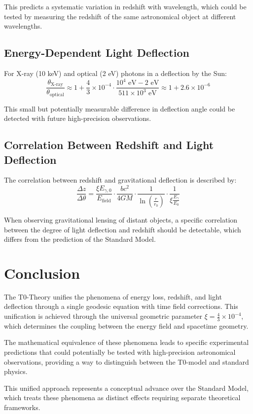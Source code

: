 \documentclass[12pt,a4paper]{article}
\newcommand{\efield}{E_{\text{field}}}
\theoremstyle{definition}
\begin{document}
	This predicts a systematic variation in redshift with wavelength, which could be tested by measuring the redshift of the same astronomical object at different wavelengths.
	
	\subsection{Energy-Dependent Light Deflection}
	
	For X-ray (10 keV) and optical (2 eV) photons in a deflection by the Sun:
	\begin{equation}
		\frac{\theta_{\text{X-ray}}}{\theta_{\text{optical}}} \approx 1 + \frac{4}{3} \times 10^{-4} \cdot \frac{10^4 \text{ eV} - 2 \text{ eV}}{511 \times 10^3 \text{ eV}} \approx 1 + 2.6 \times 10^{-6}
	\end{equation}
	
	This small but potentially measurable difference in deflection angle could be detected with future high-precision observations.
	
	\subsection{Correlation Between Redshift and Light Deflection}
	
	The correlation between redshift and gravitational deflection is described by:
	\begin{equation}
		\frac{\Delta z}{\Delta \theta} = \frac{\xi E_{\gamma,0}}{\efield} \cdot \frac{bc^2}{4GM} \cdot \frac{1}{\ln\left(\frac{r}{r_0}\right)} \cdot \frac{1}{\xi \frac{E_\gamma}{E_0}}
	\end{equation}
	
	When observing gravitational lensing of distant objects, a specific correlation between the degree of light deflection and redshift should be detectable, which differs from the prediction of the Standard Model.
	
	\section{Conclusion}
	
	The T0-Theory unifies the phenomena of energy loss, redshift, and light deflection through a single geodesic equation with time field corrections. This unification is achieved through the universal geometric parameter $\xi = \frac{4}{3} \times 10^{-4}$, which determines the coupling between the energy field and spacetime geometry.
	
	The mathematical equivalence of these phenomena leads to specific experimental predictions that could potentially be tested with high-precision astronomical observations, providing a way to distinguish between the T0-model and standard physics.
	
	This unified approach represents a conceptual advance over the Standard Model, which treats these phenomena as distinct effects requiring separate theoretical frameworks.
	
\end{document}
